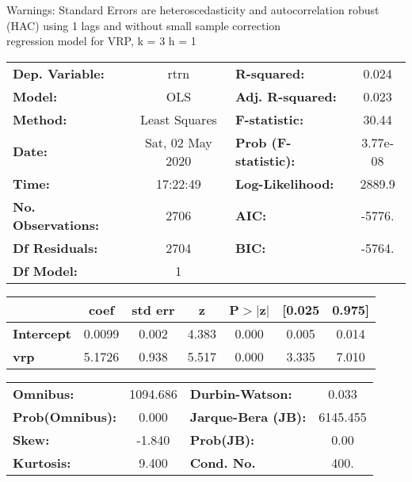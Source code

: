 Warnings: \newline
 [1] Standard Errors are heteroscedasticity and autocorrelation robust (HAC) using 1 lags and without small sample correction\\ 

regression model for VRP, k = 3 h = 1\begin{center}
\begin{tabular}{lclc}
\toprule
\textbf{Dep. Variable:}    &       rtrn       & \textbf{  R-squared:         } &     0.024   \\
\textbf{Model:}            &       OLS        & \textbf{  Adj. R-squared:    } &     0.023   \\
\textbf{Method:}           &  Least Squares   & \textbf{  F-statistic:       } &     30.44   \\
\textbf{Date:}             & Sat, 02 May 2020 & \textbf{  Prob (F-statistic):} &  3.77e-08   \\
\textbf{Time:}             &     17:22:49     & \textbf{  Log-Likelihood:    } &    2889.9   \\
\textbf{No. Observations:} &        2706      & \textbf{  AIC:               } &    -5776.   \\
\textbf{Df Residuals:}     &        2704      & \textbf{  BIC:               } &    -5764.   \\
\textbf{Df Model:}         &           1      & \textbf{                     } &             \\
\bottomrule
\end{tabular}
\begin{tabular}{lcccccc}
                   & \textbf{coef} & \textbf{std err} & \textbf{z} & \textbf{P$> |$z$|$} & \textbf{[0.025} & \textbf{0.975]}  \\
\midrule
\textbf{Intercept} &       0.0099  &        0.002     &     4.383  &         0.000        &        0.005    &        0.014     \\
\textbf{vrp}       &       5.1726  &        0.938     &     5.517  &         0.000        &        3.335    &        7.010     \\
\bottomrule
\end{tabular}
\begin{tabular}{lclc}
\textbf{Omnibus:}       & 1094.686 & \textbf{  Durbin-Watson:     } &    0.033  \\
\textbf{Prob(Omnibus):} &   0.000  & \textbf{  Jarque-Bera (JB):  } & 6145.455  \\
\textbf{Skew:}          &  -1.840  & \textbf{  Prob(JB):          } &     0.00  \\
\textbf{Kurtosis:}      &   9.400  & \textbf{  Cond. No.          } &     400.  \\
\bottomrule
\end{tabular}
\end{center}

